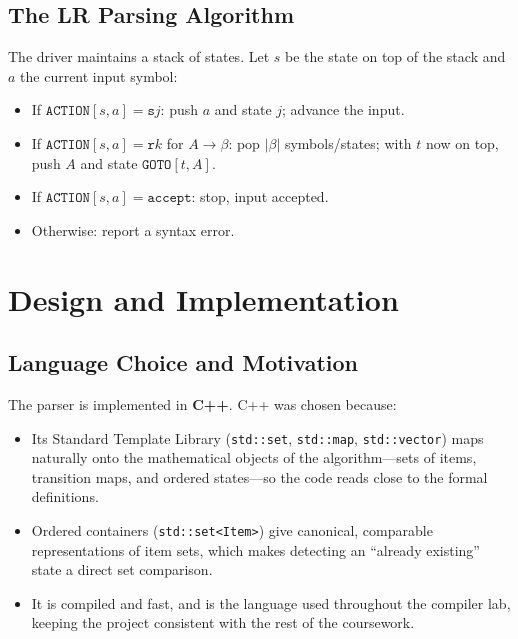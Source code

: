\documentclass[11pt,a4paper]{report}
\begin{document}
\section{The LR Parsing Algorithm}
The driver maintains a stack of states. Let $s$ be the state on top of the stack
and $a$ the current input symbol:
\begin{itemize}
  \item If $\texttt{ACTION}[s, a] = \texttt{s}j$: push $a$ and state $j$; advance the input.
  \item If $\texttt{ACTION}[s, a] = \texttt{r}k$ for $A \rightarrow \beta$: pop $|\beta|$ symbols/states; with $t$ now on top, push $A$ and state $\texttt{GOTO}[t, A]$.
  \item If $\texttt{ACTION}[s, a] = \texttt{accept}$: stop, input accepted.
  \item Otherwise: report a syntax error.
\end{itemize}

\chapter{Design and Implementation}

\section{Language Choice and Motivation}
The parser is implemented in \textbf{C++}. C++ was chosen because:
\begin{itemize}
  \item Its Standard Template Library (\texttt{std::set}, \texttt{std::map}, \texttt{std::vector}) maps naturally onto the mathematical objects of the algorithm---sets of items, transition maps, and ordered states---so the code reads close to the formal definitions.
  \item Ordered containers (\texttt{std::set<Item>}) give canonical, comparable representations of item sets, which makes detecting an ``already existing'' state a direct set comparison.
  \item It is compiled and fast, and is the language used throughout the compiler lab, keeping the project consistent with the rest of the coursework.
\end{itemize}
\end{document}

